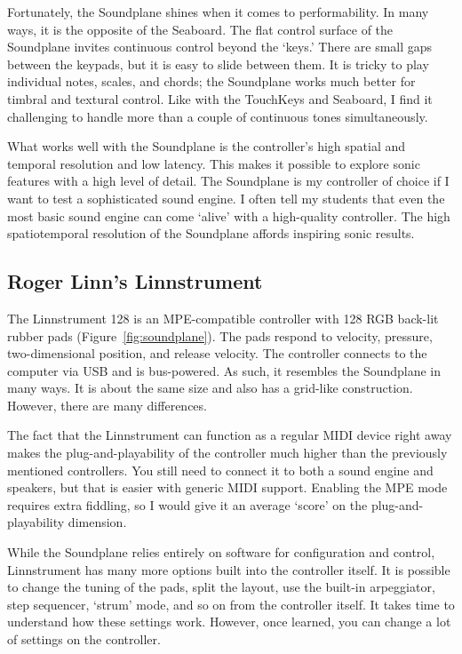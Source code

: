Fortunately, the Soundplane shines when it comes to performability. In many ways, it is the opposite of the Seaboard. The flat control surface of the Soundplane invites continuous control beyond the `keys.' There are small gaps between the keypads, but it is easy to slide between them. It is tricky to play individual notes, scales, and chords; the Soundplane works much better for timbral and textural control. Like with the TouchKeys and Seaboard, I find it challenging to handle more than a couple of continuous tones simultaneously.

What works well with the Soundplane is the controller's high spatial and temporal resolution and low latency. This makes it possible to explore sonic features with a high level of detail. The Soundplane is my controller of choice if I want to test a sophisticated sound engine. I often tell my students that even the most basic sound engine can come `alive' with a high-quality controller. The high spatiotemporal resolution of the Soundplane affords inspiring sonic results.


\subsection{Roger Linn's Linnstrument}

The Linnstrument 128 is an MPE-compatible controller with 128 RGB back-lit rubber pads (Figure~\ref{fig:soundplane}). The pads respond to velocity, pressure, two-dimensional position, and release velocity. The controller connects to the computer via USB and is bus-powered. As such, it resembles the Soundplane in many ways. It is about the same size and also has a grid-like construction. However, there are many differences.

The fact that the Linnstrument can function as a regular MIDI device right away makes the plug-and-playability of the controller much higher than the previously mentioned controllers. You still need to connect it to both a sound engine and speakers, but that is easier with generic MIDI support. Enabling the MPE mode requires extra fiddling, so I would give it an average `score' on the plug-and-playability dimension.

While the Soundplane relies entirely on software for configuration and control, Linnstrument has many more options built into the controller itself. It is possible to change the tuning of the pads, split the layout, use the built-in arpeggiator, step sequencer, `strum'  mode, and so on from the controller itself. It takes time to understand how these settings work. However, once learned, you can change a lot of settings on the controller.

